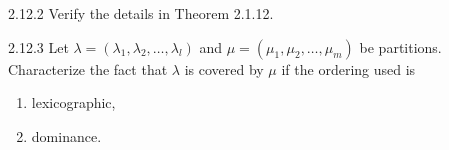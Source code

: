 \documentclass{../../math174}
\date{Monday, April 8}
\author{}
\begin{document}
\begin{problemlist}
\item[2.12.2] Verify the details in Theorem 2.1.12.

  \begin{solution}

  \end{solution}

\item[2.12.3] Let
  \(\lambda = (\lambda_1, \lambda_2, \dots, \lambda_l)\) and
  \(\mu = (\mu_1, \mu_2, \dots, \mu_m)\) be partitions.  Characterize
  the fact that \(\lambda\) is covered by \(\mu\) if the ordering used
  is
  \begin{enumerate}
  \item lexicographic,

    \begin{solution}

    \end{solution}

  \item dominance.

    \begin{solution}

    \end{solution}
  \end{enumerate}
\end{problemlist}
\end{document}
